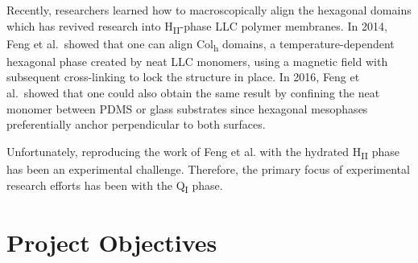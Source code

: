\documentclass{article}
\begin{document}

  Recently, researchers learned how to macroscopically align the hexagonal 
  domains which has revived research into H\textsubscript{II}-phase LLC
  polymer membranes. In 2014, Feng et al.~showed that one can align Col\textsubscript{h}
  domains, a temperature-dependent hexagonal phase created by neat LLC monomers,
  using a magnetic field with subsequent cross-linking to lock the structure 
  in place\cite{feng_scalable_2014}. In 2016, Feng et al.~showed that one could 
  also obtain the same result by confining the neat monomer between PDMS or glass 
  substrates since hexagonal mesophases preferentially anchor perpendicular to 
  both surfaces\cite{feng_thin_2016}.
  
  Unfortunately, reproducing the work of Feng et al. with the hydrated 
  H\textsubscript{II} phase has been an experimental challenge. Therefore, the
  primary focus of experimental research efforts has been with the Q\textsubscript{I} 
  phase.

  \section{Project Objectives}\label{section:objectives}  
  
\end{document}
